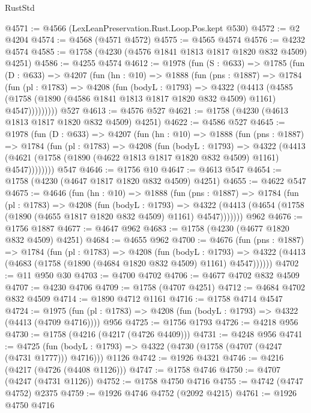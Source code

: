 \begin{lexlean}{RustStd}
\begin{coremodule}
{\begin{coremodule}
{{{{{{{{{{{{{{{@4571 := @4566 (LexLeanPreservation.Rust.Loop.Pos.kept @530)
@4572 := @2 @4204
@4574 := @4568 (@4571 @4572)
@4575 := @4565 @4574
@4576 := @4232 @4574
@4585 := @1758 (@4230 (@4576 @1841 @1813 @1817 @1820 @832 @4509) @4251)
@4586 := @4255 @4574
@4612 := @1978
    (fun (S : @633) =>
    @1785
      (fun (D : @633) =>
      @4207
        (fun (hn : @10) =>
        @1888
          (fun (pns : @1887) =>
          @1784
            (fun (pl : @1783) =>
            @4208
              (fun (bodyL : @1793) =>
              @4322
                (@4413
                  (@4585
                    (@1758 (@1890 (@4586 @1841 @1813 @1817 @1820 @832 @4509) @1161) @4547)))))))))
    @527
@4613 := @4576 @527
@4621 := @1758 (@4230 (@4613 @1813 @1817 @1820 @832 @4509) @4251)
@4622 := @4586 @527
@4645 := @1978
    (fun (D : @633) =>
    @4207
      (fun (hn : @10) =>
      @1888
        (fun (pns : @1887) =>
        @1784
          (fun (pl : @1783) =>
          @4208
            (fun (bodyL : @1793) =>
            @4322
              (@4413 (@4621 (@1758 (@1890 (@4622 @1813 @1817 @1820 @832 @4509) @1161) @4547))))))))
    @547
@4646 := @1756 @10
@4647 := @4613 @547
@4654 := @1758 (@4230 (@4647 @1817 @1820 @832 @4509) @4251)
@4655 := @4622 @547
@4675 := @4646
    (fun (hn : @10) =>
    @1888
      (fun (pns : @1887) =>
      @1784
        (fun (pl : @1783) =>
        @4208
          (fun (bodyL : @1793) =>
          @4322 (@4413 (@4654 (@1758 (@1890 (@4655 @1817 @1820 @832 @4509) @1161) @4547)))))))
    @962
@4676 := @1756 @1887
@4677 := @4647 @962
@4683 := @1758 (@4230 (@4677 @1820 @832 @4509) @4251)
@4684 := @4655 @962
@4700 := @4676
    (fun (pns : @1887) =>
    @1784
      (fun (pl : @1783) =>
      @4208
        (fun (bodyL : @1793) =>
        @4322 (@4413 (@4683 (@1758 (@1890 (@4684 @1820 @832 @4509) @1161) @4547))))))
@4702 := @11 @950 @30
@4703 := @4700 @4702
@4706 := @4677 @4702 @832 @4509
@4707 := @4230 @4706
@4709 := @1758 (@4707 @4251)
@4712 := @4684 @4702 @832 @4509
@4714 := @1890 @4712 @1161
@4716 := @1758 @4714 @4547
@4724 := @1975 (fun (pl : @1783) => @4208 (fun (bodyL : @1793) => @4322 (@4413 (@4709 @4716)))) @956
@4725 := @1756 @1793
@4726 := @4218 @956
@4730 := @1758 (@4216 (@4217 (@4726 @4409)))
@4731 := @4248 @956
@4741 := @4725
    (fun (bodyL : @1793) => @4322 (@4730 (@1758 (@4707 (@4247 (@4731 @1777))) @4716)))
    @1126
@4742 := @1926 @4321
@4746 := @4216 (@4217 (@4726 (@4408 @1126)))
@4747 := @1758 @4746
@4750 := @4707 (@4247 (@4731 @1126))
@4752 := @1758 @4750 @4716
@4755 := @4742 (@4747 @4752) @2375
@4759 := @1926 @4746 @4752 (@2092 @4215)
@4761 := @1926 @4750 @4716
}}}}}}}}}}}}}}}
\end{coremodule}}
\end{coremodule}
\end{lexlean}
